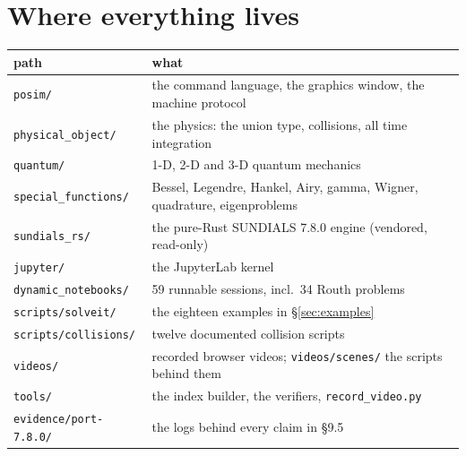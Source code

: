 \documentclass[11pt]{article}
\newcommand{\code}[1]{\texttt{#1}}
\begin{document}
\section{Where everything lives}

\begin{center}
\begin{tabular}{p{4.4cm}p{10.2cm}}
\textbf{path} & \textbf{what}\\\hline
\code{posim/} & the command language, the graphics window, the machine protocol\\
\code{physical\_object/} & the physics: the union type, collisions, all time integration\\
\code{quantum/} & 1-D, 2-D and 3-D quantum mechanics\\
\code{special\_functions/} & Bessel, Legendre, Hankel, Airy, gamma, Wigner, quadrature, eigenproblems\\
\code{sundials\_rs/} & the pure-Rust SUNDIALS 7.8.0 engine (vendored, read-only)\\
\code{jupyter/} & the JupyterLab kernel\\
\code{dynamic\_notebooks/} & 59 runnable sessions, incl.\ 34 Routh problems\\
\code{scripts/solveit/} & the eighteen examples in \S\ref{sec:examples}\\
\code{scripts/collisions/} & twelve documented collision scripts\\
\code{videos/} & recorded browser videos; \code{videos/scenes/} the scripts behind them\\
\code{tools/} & the index builder, the verifiers, \code{record\_video.py}\\
\code{evidence/port-7.8.0/} & the logs behind every claim in \S9.5\\
\end{tabular}
\end{center}
\end{document}
